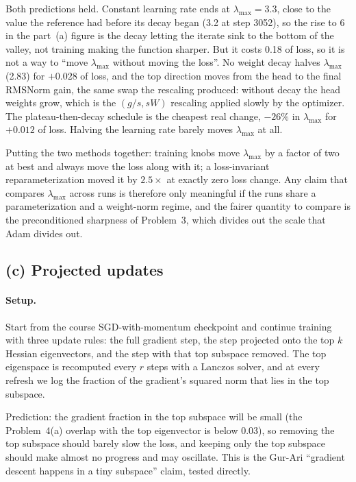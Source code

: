 \documentclass[10pt,letterpaper]{article}
\newcommand{\lmax}{\lambda_{\max}}
\begin{document}
Both predictions held. Constant learning rate ends at $\lmax=3.3$, close to the value the reference had before its decay began (3.2 at step 3052), so the rise to 6 in the part~(a) figure is the decay letting the iterate sink to the bottom of the valley, not training making the function sharper. But it costs 0.18 of loss, so it is not a way to ``move $\lmax$ without moving the loss''. No weight decay halves $\lmax$ (2.83) for $+0.028$ of loss, and the top direction moves from the head to the final RMSNorm gain, the same swap the rescaling produced: without decay the head weights grow, which is the $(g/s, sW)$ rescaling applied slowly by the optimizer. The plateau-then-decay schedule is the cheapest real change, $-26\%$ in $\lmax$ for $+0.012$ of loss. Halving the learning rate barely moves $\lmax$ at all.

Putting the two methods together: training knobs move $\lmax$ by a factor of two at best and always move the loss along with it; a loss-invariant reparameterization moved it by $2.5\times$ at exactly zero loss change. Any claim that compares $\lmax$ across runs is therefore only meaningful if the runs share a parameterization and a weight-norm regime, and the fairer quantity to compare is the preconditioned sharpness of Problem~3, which divides out the scale that Adam divides out.




\subsection*{(c) Projected updates}

\paragraph{Setup.} Start from the course SGD-with-momentum checkpoint and continue training with three update rules: the full gradient step, the step projected onto the top $k$ Hessian eigenvectors, and the step with that top subspace removed. The top eigenspace is recomputed every $r$ steps with a Lanczos solver, and at every refresh we log the fraction of the gradient's squared norm that lies in the top subspace.

Prediction: the gradient fraction in the top subspace will be small (the Problem~4(a) overlap with the top eigenvector is below 0.03), so removing the top subspace should barely slow the loss, and keeping only the top subspace should make almost no progress and may oscillate. This is the Gur-Ari ``gradient descent happens in a tiny subspace'' claim, tested directly.
\end{document}
